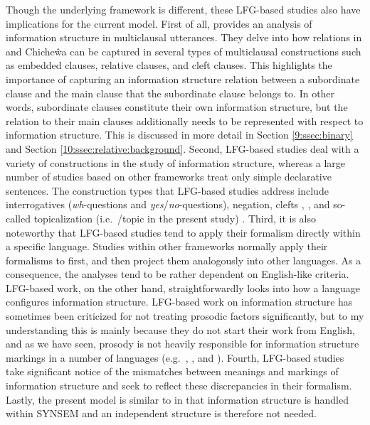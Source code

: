 Though the underlying framework is different, these LFG-based studies
also have implications for the current model.  First of all,
\citet{bresnan:mchombo:87} provides an analysis of information
structure in multiclausal utterances. They delve into how 
relations in  and Chiche{\^w}a can be captured in several
types of multiclausal constructions such as embedded clauses, relative
clauses, and cleft clauses. This highlights the
importance of capturing an information structure relation between a
subordinate clause and the main clause that the subordinate clause
belongs to. In other words, subordinate clauses constitute their own
information structure, but the relation to their main clauses
additionally needs to be represented with respect to information
structure.  This is discussed in more detail in Section \ref{9:ssec:binary}
and Section \ref{10:ssec:relative:background}.  Second, LFG-based studies deal
with a variety of constructions in the study of information structure,
whereas a large number of studies based on other frameworks treat only
simple declarative sentences. The construction types that LFG-based
studies address include interrogatives
(\textit{wh}-questions and
\textit{yes}/\textit{no}-questions), negation, clefts
\citep{king:95},  \citep{choi:99}, and so-called
topicalization (i.e.\ /topic  in the present study)
\citep{man:07}.  Third, it is also noteworthy that LFG-based studies
tend to apply their formalism directly within a specific
language. Studies within other frameworks normally apply their
formalisms to  first, and then project them analogously
into other languages. As a consequence, the analyses tend to be rather
dependent on English-like criteria. LFG-based work, on the other hand,
straightforwardly looks into how a language configures information
structure. LFG-based work on information structure has sometimes been
criticized for not treating prosodic factors significantly, but to my
understanding this is mainly because they do not start their work from
English, and as we have seen, prosody is not heavily
responsible for information structure markings in a number of
languages (e.g.\ , , and
).  Fourth, LFG-based studies take significant notice
of the mismatches between meanings and markings of information
structure and seek to reflect these discrepancies in their
formalism. Lastly, the present model is similar to
\citet{bresnan:mchombo:87} in that information structure is handled
within SYNSEM and an independent structure is therefore not needed.



